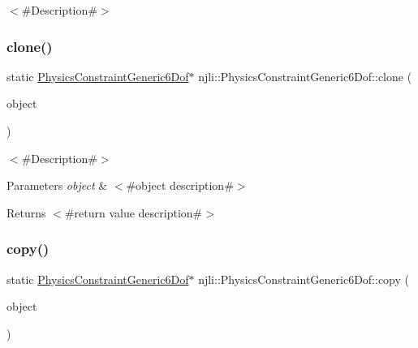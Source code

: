 $<$\#\+Description\#$>$ \mbox{\label{classnjli_1_1_physics_constraint_generic6_dof_a75cf11aab13266cac631ea51d084c2d2}} 
\subsubsection{\texorpdfstring{clone()}{clone()}}
{\footnotesize\ttfamily static \mbox{\hyperlink{classnjli_1_1_physics_constraint_generic6_dof}{Physics\+Constraint\+Generic6\+Dof}}$\ast$ njli\+::\+Physics\+Constraint\+Generic6\+Dof\+::clone (\begin{DoxyParamCaption}\item[{const \mbox{\hyperlink{classnjli_1_1_physics_constraint_generic6_dof}{Physics\+Constraint\+Generic6\+Dof}} \&}]{object }\end{DoxyParamCaption})\hspace{0.3cm}{\ttfamily [static]}}

$<$\#\+Description\#$>$


\begin{DoxyParams}{Parameters}
{\em object} & $<$\#object description\#$>$\\
\hline
\end{DoxyParams}
\begin{DoxyReturn}{Returns}
$<$\#return value description\#$>$ 
\end{DoxyReturn}
\mbox{\label{classnjli_1_1_physics_constraint_generic6_dof_afb151ae4e2a88a7ee3f92ea035497773}} 
\subsubsection{\texorpdfstring{copy()}{copy()}}
{\footnotesize\ttfamily static \mbox{\hyperlink{classnjli_1_1_physics_constraint_generic6_dof}{Physics\+Constraint\+Generic6\+Dof}}$\ast$ njli\+::\+Physics\+Constraint\+Generic6\+Dof\+::copy (\begin{DoxyParamCaption}\item[{const \mbox{\hyperlink{classnjli_1_1_physics_constraint_generic6_dof}{Physics\+Constraint\+Generic6\+Dof}} \&}]{object }\end{DoxyParamCaption})\hspace{0.3cm}{\ttfamily [static]}}

